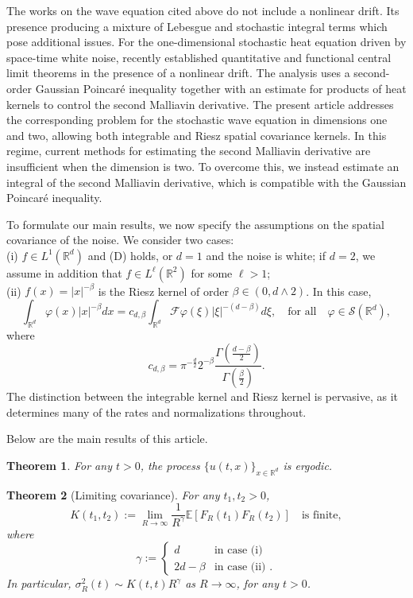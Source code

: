 \documentclass[12pt]{article}
\newtheorem{theorem}{Theorem}[section]
\def\cF{\mathcal{F}}
\def\cS{\mathcal{S}}
\def\bE{\mathbb{E}}
\def\bR{\mathbb{R}}
\begin{document}
The works on the wave equation cited above do not include a nonlinear drift. Its presence producing a mixture of Lebesgue and stochastic integral terms which pose additional issues. For the one-dimensional stochastic heat equation driven by space-time white noise, \cite{BS26} recently established quantitative and functional central limit theorems in the presence of a nonlinear drift. The analysis uses a second-order Gaussian Poincar\'e inequality together with an estimate for products of heat kernels to control the second Malliavin derivative. The present article addresses the corresponding problem for the stochastic wave equation in dimensions one and two, allowing both integrable and Riesz spatial covariance kernels. In this regime, current methods for estimating the second Malliavin derivative are insufficient when the dimension is two. To overcome this, we instead estimate an integral of the second Malliavin derivative, which is compatible with the Gaussian Poincar\'e inequality. 
\medskip

To formulate our main results, we now specify the assumptions on the spatial covariance of the noise. We consider two cases: \\
(i) $f\in L^1(\bR^d)$ and (D) holds, or $d=1$ and the noise is white; if $d = 2$, we assume in addition that $f \in L^{\ell}(\bR^2)$ for some $\ell > 1$;
\\
(ii) $f(x)=|x|^{-\beta}$ is the Riesz kernel of order $\beta \in (0,d\wedge 2)$. In this case,
\[
\int_{\bR^d}\varphi(x)|x|^{-\beta}dx=c_{d,\beta} \int_{\bR^d}\cF \varphi(\xi) |\xi|^{-(d-\beta)}d\xi, \quad \mbox{for all} \quad \varphi \in \cS(\bR^d),
\]
where
\[
c_{d,\beta}=\pi^{-\frac{d}{2}} 2^{-\beta} \frac{\Gamma(\frac{d-\beta}{2})}{\Gamma(\frac{\beta}{2})}.
\]
The distinction between the integrable kernel and Riesz kernel is pervasive, as it determines many of the rates and normalizations throughout.

\medskip

Below are the main results of this article.


\begin{theorem}
\label{ergodic-th}
For any $t>0$, the process $\{u(t,x)\}_{x\in \bR^d}$ is ergodic.
\end{theorem}

\begin{theorem}[Limiting covariance]
\label{cov-th}
For any $t_1,t_2>0$,
\begin{equation}
\label{def-K}
K(t_1,t_2):=\lim_{R \to \infty}\frac{1}{R^{\gamma}}\bE[F_R(t_1) F_R(t_2)] \quad \mbox{is finite},
\end{equation}
where
\begin{equation}
\label{def-gamma}
\gamma:=\left\{
\begin{array}{ll} d & \mbox{in case (i)} \\
2d-\beta & \mbox{in case (ii) }.
\end{array} \right.
\end{equation}
In particular, $\sigma_R^2(t) \sim K(t,t) R^{\gamma}$ as $R \to \infty$, for any $t>0$.
\end{theorem}
\end{document}
